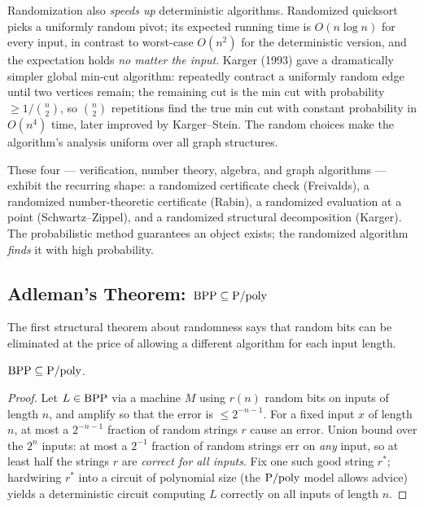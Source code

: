 \begin{example}
Randomization also \emph{speeds up} deterministic algorithms. Randomized quicksort picks a uniformly random pivot; its expected running time is $O(n \log n)$ for every input, in contrast to worst-case $O(n^2)$ for the deterministic version, and the expectation holds \emph{no matter the input}. Karger (1993) gave a dramatically simpler global min-cut algorithm: repeatedly contract a uniformly random edge until two vertices remain; the remaining cut is the min cut with probability $\ge 1/\binom{n}{2}$, so $\binom{n}{2}$ repetitions find the true min cut with constant probability in $O(n^4)$ time, later improved by Karger--Stein. The random choices make the algorithm's analysis uniform over all graph structures.
\end{example}

These four --- verification, number theory, algebra, and graph algorithms --- exhibit the recurring shape: a randomized certificate check (Freivalds), a randomized number-theoretic certificate (Rabin), a randomized evaluation at a point (Schwartz--Zippel), and a randomized structural decomposition (Karger). The probabilistic method guarantees an object exists; the randomized algorithm \emph{finds} it with high probability.

\subsection{Adleman's Theorem: $\text{BPP} \subseteq \text{P}/\text{poly}$}
\label{sec:randomized:adleman}

The first structural theorem about randomness says that random bits can be eliminated at the price of allowing a different algorithm for each input length.

\begin{theorem}[Adleman 1978]
$\text{BPP} \subseteq \text{P}/\text{poly}$.
\end{theorem}

\begin{proof}
Let $L \in \text{BPP}$ via a machine $M$ using $r(n)$ random bits on inputs of length $n$, and amplify so that the error is $\le 2^{-n-1}$. For a fixed input $x$ of length $n$, at most a $2^{-n-1}$ fraction of random strings $r$ cause an error. Union bound over the $2^n$ inputs: at most a $2^{-1}$ fraction of random strings err on \emph{any} input, so at least half the strings $r$ are \emph{correct for all inputs}. Fix one such good string $r^*$; hardwiring $r^*$ into a circuit of polynomial size (the $\text{P}/\text{poly}$ model allows advice) yields a deterministic circuit computing $L$ correctly on all inputs of length $n$.
\end{proof}

